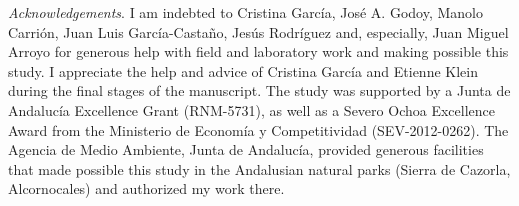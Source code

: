 \documentclass[a4paper, 12pt]{article}
\begin{document}
\begin{linenumbers}
\emph{Acknowledgements}. I am indebted to Cristina García, José A. Godoy, Manolo Carrión, Juan Luis García-Castaño, Jesús Rodríguez and, especially, Juan Miguel Arroyo for generous help with field and laboratory work and making possible this study. I appreciate the help and advice of Cristina García and Etienne Klein during the final stages of the manuscript. The study was supported by a Junta de Andalucía Excellence Grant (RNM-5731), as well as a Severo Ochoa Excellence Award from the Ministerio de Economía y Competitividad (SEV-2012-0262). The Agencia de Medio Ambiente, Junta de Andalucía, provided generous facilities that made possible this study in the Andalusian natural parks (Sierra de Cazorla, Alcornocales) and authorized my work there.

\end{linenumbers}

\newpage




\newpage
\end{document}
